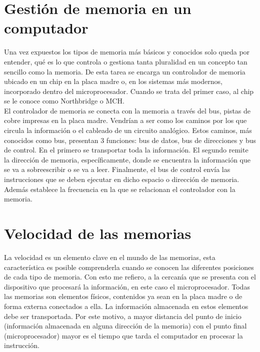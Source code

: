 \documentclass{article}
\begin{document}
\section{Gestión de memoria en un computador}
\noindent

Una vez expuestos los tipos de memoria más básicos y conocidos solo queda por entender, qué es lo que controla o gestiona tanta pluralidad en un concepto tan sencillo como la memoria.
De esta tarea se encarga un controlador de memoria ubicado en un chip en la placa madre o, en los sistemas más modernos, incorporado dentro del microprocesador. Cuando se trata del primer caso, al chip se le conoce como Northbridge o MCH.\\

\noindent
El controlador de memoria se conecta con la memoria a través del bus, pistas de cobre impresas en la placa madre. Vendrían a ser como los caminos por los que circula la información o el cableado de un circuito analógico.
Estos caminos, más conocidos como bus, presentan 3 funciones: bus de datos, bus de direcciones y bus de control.
En el primero se transportar toda la información.
El segundo remite la dirección de memoria, específicamente, donde se encuentra la información que se va a sobreescribir o se va a leer.
Finalmente, el bus de control envía las instrucciones que se deben ejecutar en dicho espacio o dirección de memoria. Además establece la frecuencia en la que se relacionan el controlador con la memoria. \cite{Augusto}

\section{Velocidad de las memorias}
\noindent
La velocidad es un elemento clave en el mundo de las memorias, esta característica es posible comprenderla cuando se conocen las diferentes posiciones de cada tipo de memoria. Con esto me refiero, a la cercanía que se presenta con el dispositivo que procesará la información, en este caso el microprocesador. 
Todas las memorias son elementos físicos, contenidos ya sean en la placa madre o de forma externa conectados a ella. La información almacenada en estos elementos debe ser transportada. Por este motivo, a mayor distancia del punto de inicio (información almacenada en alguna dirección de la memoria) con el punto final (microprocesador) mayor es el tiempo que tarda el computador en procesar la instrucción. 



\end{document}
